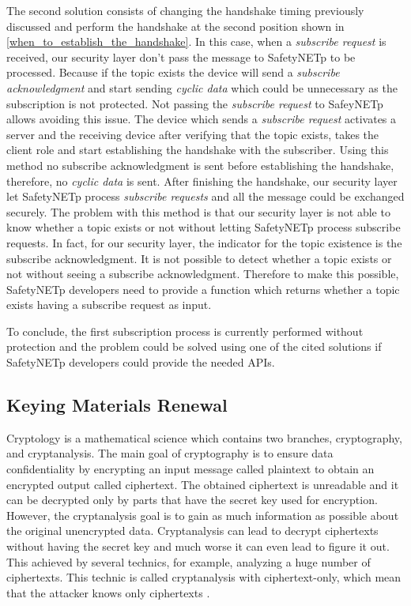 The second solution consists of changing the handshake timing previously discussed and perform the handshake
at the second position shown in \autoref{when_to_establish_the_handshake}. In this case, when a \textit{subscribe request} is
received, our security layer don't pass the message to SafetyNETp to be processed. Because if the topic exists
the device will send a \textit{subscribe acknowledgment} and start sending \textit{cyclic data} which could be unnecessary as
the subscription is not protected. Not passing the \textit{subscribe request} to SafeyNETp allows avoiding this issue.
The device which sends a \textit{subscribe request} activates a server and the receiving device after verifying that the topic exists,
takes the client role and start establishing the handshake with the subscriber. Using this method no subscribe acknowledgment
is sent before establishing the handshake, therefore, no \textit{cyclic data} is sent. After finishing the handshake, our security
layer let SafetyNETp process \textit{subscribe requests} and all the message could be exchanged securely. The problem with this
method is that our security layer is not able to know whether a topic exists or not without letting SafetyNETp process
subscribe requests. In fact, for our security layer, the indicator for the topic existence is the subscribe acknowledgment.
It is not possible to detect whether a topic exists or not without seeing a subscribe acknowledgment. Therefore to make
this possible, SafetyNETp developers need to provide a function which returns whether a topic exists having a subscribe
request as input.

To conclude, the first subscription process is currently performed without protection and the problem
could be solved using one of the cited solutions if SafetyNETp developers could provide the needed APIs.


\subsection{Keying Materials Renewal}

Cryptology is a mathematical science which contains two branches, cryptography, and cryptanalysis.
The main goal of cryptography is to ensure data confidentiality by encrypting an input message called
plaintext to obtain an encrypted output called ciphertext. The obtained ciphertext is unreadable and it can
be decrypted only by parts that have the secret key used for encryption. However, the cryptanalysis
goal is to gain as much information as possible about the original unencrypted data. Cryptanalysis
can lead to decrypt ciphertexts without having the secret key and much worse it can even lead to figure it out. This achieved by several technics, for example, analyzing a huge number of ciphertexts.
This technic is called cryptanalysis with ciphertext-only, which mean that the attacker knows only ciphertexts \cite{Cryptology}.

